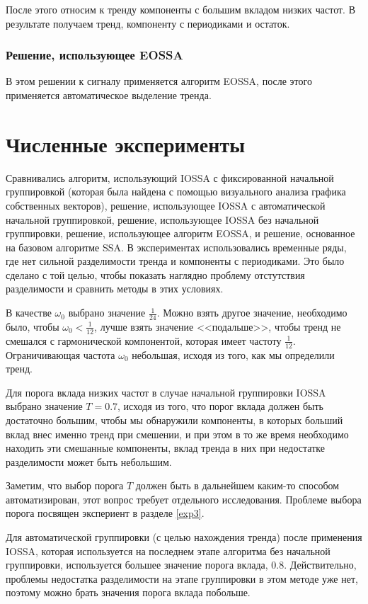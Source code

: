 \documentclass[specialist, substylefile = spbureport.rtx, subf,href,colorlinks=true, 12pt]{disser}
\theoremstyle{definition}
\begin{document}
После этого относим к тренду компоненты с большим вкладом низких
частот. В результате получаем тренд, компоненту с периодиками и остаток.

\subsection{Решение, использующее EOSSA}
В этом решении к сигналу применяется алгоритм EOSSA, после этого применяется автоматическое выделение тренда.

\chapter{Численные эксперименты}
Сравнивались алгоритм, использующий IOSSA с фиксированной начальной группировкой (которая была найдена с помощью визуального анализа графика собственных векторов),
решение, использующее IOSSA с автоматической начальной группировкой, решение, использующее IOSSA без начальной группировки, решение, использующее алгоритм EOSSA, и решение, основанное на базовом алгоритме SSA. В экспериментах использовались временные ряды, где нет сильной разделимости тренда и компоненты с периодиками. Это было сделано с той целью, чтобы показать наглядно проблему отстутствия разделимости и сравнить методы в этих условиях.

В качестве $\omega_0$ выбрано значение $\frac{1}{24}$. Можно взять другое значение, необходимо было, чтобы $\omega_0 < \frac{1}{12}$, лучше взять значение <<подальше>>, чтобы тренд не смешался с гармонической компонентой, которая имеет частоту $\frac{1}{12}$. Ограничивающая частота $\omega_0$ небольшая, исходя из того, как мы определили тренд.

Для порога вклада низких частот в случае начальной группировки IOSSA выбрано значение $T = 0.7$, исходя из того, что порог вклада должен быть достаточно большим, чтобы мы обнаружили компоненты, в которых больший вклад внес именно тренд при смешении, и при этом в то же время необходимо находить эти смешанные компоненты, вклад тренда в них при недостатке разделимости может быть небольшим.

Заметим, что выбор порога $T$ должен быть в дальнейшем каким-то способом автоматизирован, этот вопрос требует отдельного исследования. Проблеме выбора порога посвящен экспериент в разделе \ref{exp3}.

Для автоматической группировки (с целью нахождения тренда) после применения IOSSA, которая используется на последнем этапе алгоритма без начальной группировки, используется большее значение порога вклада, $0.8$. Действительно, проблемы недостатка разделимости на этапе группировки в этом методе уже нет, поэтому можно брать значения порога вклада побольше.
\end{document}
